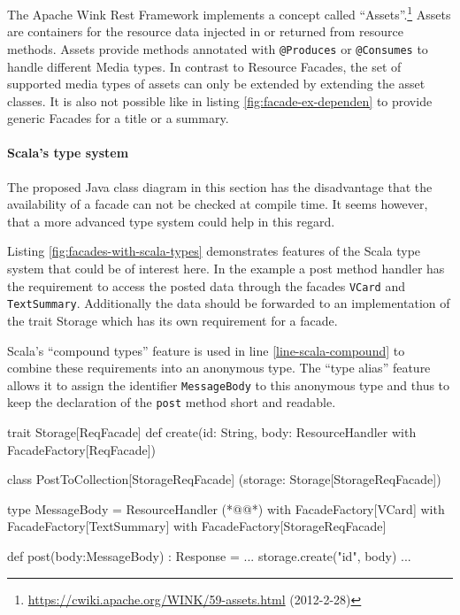 \documentclass[12pt,a4paper]{scrartcl}		%
\newcommand{\citeurl}[2]{\url{#1} (#2)}
\begin{document}
The Apache Wink Rest Framework implements a concept called
``Assets''.\footnote{\citeurl{https://cwiki.apache.org/WINK/59-assets.html}{2012-2-28}}
Assets are containers for the resource data injected in or returned from
resource methods. Assets provide methods annotated with \lstinline:@Produces: or
\lstinline:@Consumes: to handle different Media types. In contrast to Resource
Facades, the set of supported media types of assets can only be extended by
extending the asset classes. It is also not possible like in listing
\ref{fig:facade-ex-dependen} to provide generic Facades for a title or a
summary.

\paragraph{Scala's type system}
The proposed Java class diagram in this section has the disadvantage that the
availability of a facade can not be checked at compile time. It seems however,
that a more advanced type system could help in this regard.

Listing \ref{fig:facades-with-scala-types} demonstrates features of the Scala
type system\cite{Odersky2011} that could be of interest here. In the example a
post method handler has the requirement to access the posted data through the
facades \lstinline:VCard: and \lstinline:TextSummary:. Additionally the data
should be forwarded to an implementation of the trait Storage which has its own
requirement for a facade.

Scala's ``compound types'' feature is used in line \ref{line-scala-compound} to
combine these requirements into an anonymous type. The ``type alias'' feature
allows it to assign the identifier \lstinline:MessageBody: to this anonymous
type and thus to keep the declaration of the \lstinline:post: method short and
readable.

\begin{javalisting}[label=fig:facades-with-scala-types,
                   numbers=left,
                   escapeinside={(*@}{@*)},
                   caption={Implementing the facades approach with Scala's type system}]
trait Storage[ReqFacade] {
 def create(id: String,
            body: ResourceHandler with FacadeFactory[ReqFacade])
}

class PostToCollection[StorageReqFacade]
            (storage: Storage[StorageReqFacade]) {
 type MessageBody = ResourceHandler (*@\label{line-scala-compound}@*)
                      with FacadeFactory[VCard] 
                      with FacadeFactory[TextSummary]
                      with FacadeFactory[StorageReqFacade]
  
 def post(body:MessageBody) : Response = {
  ...
  storage.create("id", body)
  ...
 }
}
\end{javalisting}
\end{document}
